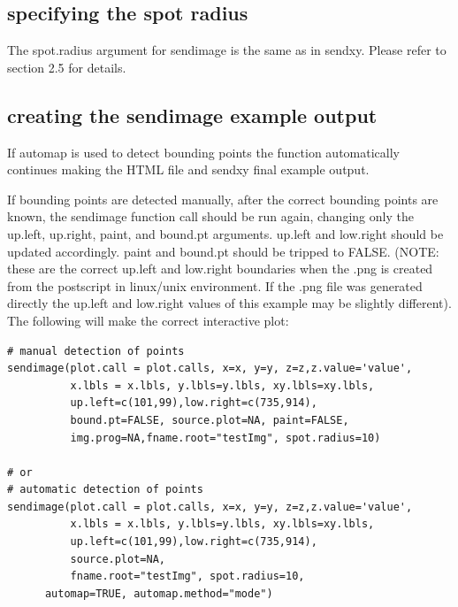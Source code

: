 \documentclass[]{article}
\begin{document}
\subsection{specifying the spot radius}

\indent The spot.radius argument for sendimage is the same as in sendxy. Please refer to section 2.5 for details. 

\subsection{creating the sendimage example output}

\indent If automap is used to detect bounding points the function automatically continues making the HTML file and sendxy final example output. 

\indent If bounding points are detected manually, after the correct bounding points are known, the sendimage function call should be run again, changing only the up.left, up.right, paint, and bound.pt arguments. up.left and low.right should be updated accordingly. paint and bound.pt should be tripped to FALSE. (NOTE: these are the correct up.left and low.right boundaries when the .png is created from the postscript in linux/unix environment. If the .png file was generated directly the up.left and low.right values of this example may be slightly different).  The following will make the correct interactive plot:

\begin{verbatim}
# manual detection of points
sendimage(plot.call = plot.calls, x=x, y=y, z=z,z.value='value',
          x.lbls = x.lbls, y.lbls=y.lbls, xy.lbls=xy.lbls,
          up.left=c(101,99),low.right=c(735,914),
          bound.pt=FALSE, source.plot=NA, paint=FALSE,
          img.prog=NA,fname.root="testImg", spot.radius=10)

# or 
# automatic detection of points
sendimage(plot.call = plot.calls, x=x, y=y, z=z,z.value='value',
          x.lbls = x.lbls, y.lbls=y.lbls, xy.lbls=xy.lbls,
          up.left=c(101,99),low.right=c(735,914),
          source.plot=NA,
          fname.root="testImg", spot.radius=10, 
	  automap=TRUE, automap.method="mode")


\end{verbatim}
\end{document}
